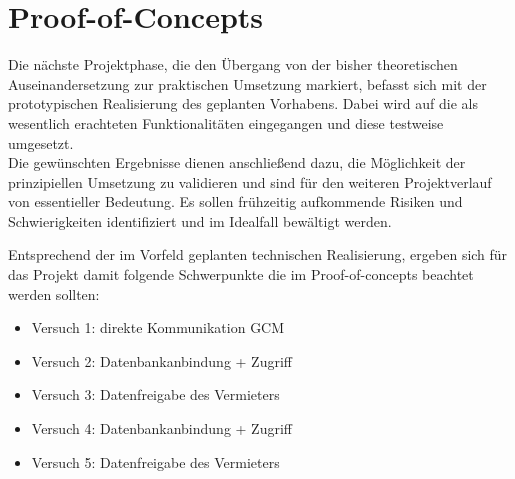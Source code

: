 
\section{Proof-of-Concepts}
Die nächste Projektphase, die den Übergang von der bisher theoretischen Auseinandersetzung zur praktischen Umsetzung markiert, befasst sich mit der prototypischen Realisierung des geplanten Vorhabens. Dabei wird auf die als wesentlich erachteten  Funktionalitäten eingegangen und diese testweise umgesetzt.\\
Die gewünschten Ergebnisse dienen anschließend dazu, die Möglichkeit der prinzipiellen Umsetzung zu validieren und sind für den weiteren Projektverlauf von essentieller Bedeutung. Es sollen frühzeitig aufkommende Risiken und Schwierigkeiten identifiziert  und im Idealfall bewältigt werden.

\vspace{0.5cm}

Entsprechend der im Vorfeld geplanten technischen Realisierung, ergeben sich für das Projekt damit folgende Schwerpunkte die im Proof-of-concepts beachtet werden sollten:\\
\begin{itemize}
   \item Versuch 1: direkte Kommunikation GCM
   \item Versuch 2: Datenbankanbindung + Zugriff
   \item Versuch 3: Datenfreigabe des Vermieters
   \item Versuch 4: Datenbankanbindung + Zugriff
   \item Versuch 5: Datenfreigabe des Vermieters



  
\end{itemize}